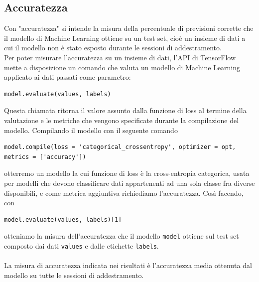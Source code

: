 \subsection{Accuratezza}
Con "accuratezza" si intende la misura della percentuale di previsioni corrette che il modello di Machine Learning ottiene su un test set, cioè un insieme di dati a cui il modello non è stato esposto durante le sessioni di addestramento.\\
Per poter misurare l'accuratezza su un insieme di dati, l'API di TensorFlow mette a disposizione un comando che valuta un modello di Machine Learning applicato ai dati passati come parametro:
\begin{lstlisting}[style = myPython]
model.evaluate(values, labels)
\end{lstlisting}
Questa chiamata ritorna il valore assunto dalla funzione di loss al termine della valutazione e le metriche che vengono specificate durante la compilazione del modello. Compilando il modello con il seguente comando
\begin{lstlisting}[style = myPython]
model.compile(loss = 'categorical_crossentropy', optimizer = opt, metrics = ['accuracy'])
\end{lstlisting}
otterremo un modello la cui funzione di loss è la cross-entropia categorica, usata per modelli che devono classificare dati appartenenti ad una sola classe fra diverse disponibili, e come metrica aggiuntiva richiediamo l'accuratezza. Così facendo, con
\begin{lstlisting}[style = myPython]
model.evaluate(values, labels)[1]
\end{lstlisting}
otteniamo la misura dell'accuratezza che il modello \texttt{model} ottiene sul test set composto dai dati \texttt{values} e dalle etichette \texttt{labels}.\\\\
La misura di accuratezza indicata nei risultati è l'accuratezza media ottenuta dal modello su tutte le sessioni di addestramento.
